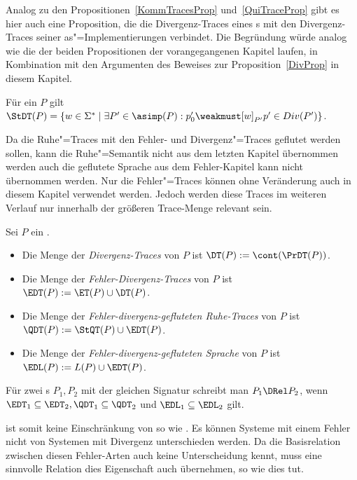 Analog zu den Propositionen~\ref{KommTracesProp} und~\ref{QuiTraceProp} gibt es
hier auch eine Proposition, die die Divergenz-Traces eines \MEIO{}s mit den
Divergenz-Traces seiner as"=Implementierungen verbindet. Die Begründung würde
analog wie die der beiden Propositionen der vorangegangenen Kapitel laufen, in
Kombination mit den Argumenten des Beweises zur Proposition~\ref{DivProp} in
diesem Kapitel.

\begin{Prop}
  Für ein \MEIO{} $P$ gilt $\StDT (P) = \left\{w\in\Sigma ^*\mid \exists P' \in
  \asimp (P): p'_0\weakmust[w]_{P'} p'\in Div(P')\right\}$.
\end{Prop}

Da die Ruhe"=Traces mit den Fehler- und Divergenz"=Traces
geflutet werden sollen, kann die Ruhe"=Semantik nicht aus dem letzten Kapitel
übernommen werden auch die geflutete Sprache aus dem
Fehler-Kapitel kann nicht übernommen werden. Nur die
Fehler"=Traces \ET{} können ohne Veränderung auch in diesem
Kapitel verwendet werden. Jedoch werden diese Traces im weiteren Verlauf nur
innerhalb der größeren Trace-Menge \EDT{} relevant sein.

\begin{Def}
  \label{DivSemDef}
  Sei $P$ ein \MEIO{}.
  \begin{itemize}
    \item Die Menge der \emph{Divergenz-Traces} von $P$ ist $\DT (P) := \cont
      (\PrDT (P))$.
    \item Die Menge der \emph{Fehler-Divergenz-Traces} von $P$ ist $\EDT (P) :=
      \ET (P)\cup\DT (P)$.
    \item Die Menge der \emph{Fehler-divergenz-gefluteten
      Ruhe-Traces} von $P$ ist $\QDT (P) := \StQT (P)\cup\EDT (P)$.
    \item Die Menge der \emph{Fehler-divergenz-gefluteten
      Sprache} von $P$ ist $\EDL (P) := L(P)\cup\EDT (P)$.
  \end{itemize}
  Für zwei \MEIO{}s $P_1,P_2$ mit der gleichen Signatur schreibt man $P_1\DRel
  P_2$, wenn $\EDT _1\subseteq \EDT _2, \QDT _1\subseteq \QDT _2$ und $\EDL
  _1\subseteq \EDL _2$ gilt.
\end{Def}

\DRel{} ist somit keine Einschränkung von \ERel{} so wie \QRel{}. Es können
Systeme mit einem Fehler nicht von Systemen mit Divergenz
unterschieden werden. Da die Basisrelation zwischen diesen Fehler-Arten auch
keine Unterscheidung kennt, muss eine sinnvolle Relation dies Eigenschaft auch
übernehmen, so wie \DRel{} dies tut.

